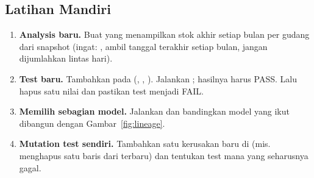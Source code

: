 \subsection{Latihan Mandiri}
\begin{enumerate}
    \item \textbf{Analysis baru.} Buat  yang menampilkan stok akhir setiap bulan per gudang dari snapshot (ingat:  , ambil tanggal terakhir setiap bulan, jangan dijumlahkan lintas hari).
    \item \textbf{Test baru.} Tambahkan  pada  (, , ). Jalankan ; hasilnya harus PASS. Lalu hapus satu nilai dan pastikan test menjadi FAIL.
    \item \textbf{Memilih sebagian model.} Jalankan  dan bandingkan model yang ikut dibangun dengan Gambar~\ref{fig:lineage}.
    \item \textbf{Mutation test sendiri.} Tambahkan satu kerusakan baru di  (mis. menghapus satu baris dari  terbaru) dan tentukan test mana yang seharusnya gagal.
\end{enumerate}

